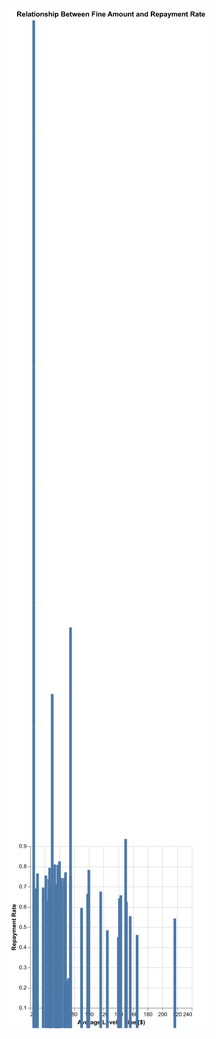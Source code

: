 \documentclass[
  letterpaper,
  DIV=11,
  numbers=noendperiod]{scrartcl}
\begin{document}
\includegraphics{ps2_answers_files/figure-pdf/cell-21-output-3.png}
\end{document}
